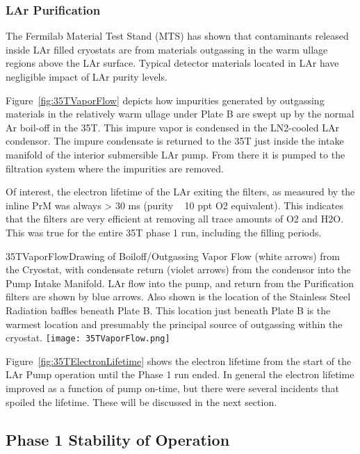 \subsubsection{LAr Purification}

The Fermilab Material Test Stand (MTS)\cite{bib:Voiron9940,bib:mtslapd308} has shown that contaminants released inside LAr filled cryostats are from materials outgassing in the warm ullage regions above the LAr surface. Typical detector materials located in LAr have negligible impact of LAr purity levels. 

Figure~\ref{fig:35TVaporFlow} depicts how impurities generated by outgassing materials in the 
relatively warm ullage under Plate B are swept up by the normal Ar boil-off in the 35T. This impure vapor 
is condensed in the LN2-cooled LAr condensor. The impure condensate is returned to the 35T just inside 
the intake manifold of the interior submersible LAr pump. From there it is pumped to the filtration 
system where the impurities are removed.

Of interest, the electron lifetime of the LAr exiting the filters, as measured by the inline PrM was always  
> 30 ms (purity ~ 10 ppt O2 equivalent). This indicates that the filters are very efficient at removing all 
trace amounts of O2 and H2O. This was true for the entire 35T phase 1 run, including the filling periods.

\begin{cdrfigure}{35TVaporFlow}{Drawing of Boiloff/Outgassing Vapor Flow (white 
arrows) from the Cryostat, with condensate return (violet arrows) from the condensor into the Pump 
Intake Manifold. LAr flow into the pump, and return from the Purification filters are shown by blue 
arrows. Also shown is the location of the Stainless Steel Radiation baffles beneath Plate B. This location 
just beneath Plate B is the warmest location and presumably the principal source of outgassing within the 
cryostat.}
  \texttt{[image: 35TVaporFlow.png]}
\end{cdrfigure}

Figure~\ref{fig:35TElectronLifetime} shows the electron lifetime from the start of the LAr Pump operation until the Phase 1 run ended. In general the electron lifetime improved as a function of pump on-time, but there were several incidents that spoiled the lifetime. These will be discussed in the next section.

\subsection {Phase 1 Stability of Operation}

